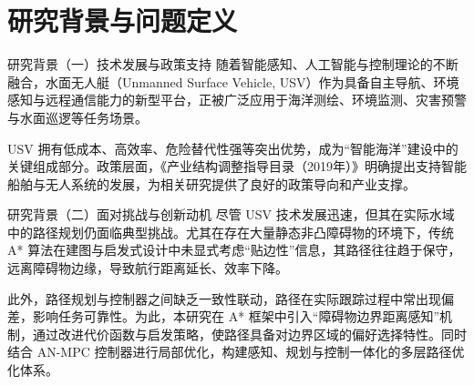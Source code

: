 \section{研究背景与问题定义}

\begin{frame}{研究背景（一）技术发展与政策支持}
    \justifying
    随着智能感知、人工智能与控制理论的不断融合，水面无人艇（Unmanned Surface Vehicle, USV）作为具备自主导航、环境感知与远程通信能力的新型平台，正被广泛应用于海洋测绘、环境监测、灾害预警与水面巡逻等任务场景。
    
    \vspace{0.8em}
    USV 拥有低成本、高效率、危险替代性强等突出优势，成为“智能海洋”建设中的关键组成部分。政策层面，《产业结构调整指导目录（2019年）》明确提出支持智能船舶与无人系统的发展，为相关研究提供了良好的政策导向和产业支撑。
    \end{frame}
    
\begin{frame}{研究背景（二）面对挑战与创新动机}
\justifying
尽管 USV 技术发展迅速，但其在实际水域中的路径规划仍面临典型挑战。尤其在存在大量静态非凸障碍物的环境下，传统 A* 算法在建图与启发式设计中未显式考虑“贴边性”信息，其路径往往趋于保守，远离障碍物边缘，导致航行距离延长、效率下降。

\vspace{0.8em}
此外，路径规划与控制器之间缺乏一致性联动，路径在实际跟踪过程中常出现偏差，影响任务可靠性。为此，本研究在 A* 框架中引入“障碍物边界距离感知”机制，通过改进代价函数与启发策略，使路径具备对边界区域的偏好选择特性。同时结合 AN-MPC 控制器进行局部优化，构建感知、规划与控制一体化的多层路径优化体系。
\end{frame}
